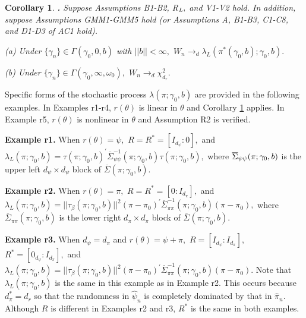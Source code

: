 \documentclass[12pt,titlepage,final,oneside,letterpaper]{article}
\newtheorem{corollary}{Corollary}[section]
\begin{document}
\begin{corollary}
\hspace{-0.08in}\textbf{.} \label{Cor Wald Linear}Suppose Assumptions \emph{%
B1-B2, R}$_{\text{\emph{L}}},$ and \emph{V1-V2} hold. In addition, suppose
Assumptions \emph{GMM1-GMM5 }hold \emph{(}or Assumptions \emph{A, B1-B3,
C1-C8, }and \emph{D1-D3 }of \emph{AC1 }hold\emph{).}

\noindent \emph{(a) }Under $\{\gamma _{n}\}\in \Gamma (\gamma _{0},0,b)$
with $||b||<\infty ,$ $W_{n}\rightarrow _{d}\lambda _{L}(\pi ^{\ast }(\gamma
_{0},b);\gamma _{0},b).$

\noindent \emph{(b) }Under $\{\gamma _{n}\}\in \Gamma (\gamma _{0},\infty
,\omega _{0}),$ $W_{n}\rightarrow _{d}\chi _{d_{r}}^{2}.$
\end{corollary}

Specific forms of the stochastic process $\lambda (\pi ;\gamma _{0},b)$ are
provided in the following examples. In Examples r1-r4, $r(\theta )$ is
linear in $\theta $ and Corollary \ref{Cor Wald Linear} applies. In Example
r5, $r(\theta )$ is nonlinear in $\theta $ and Assumption R2 is
verified.\medskip

\noindent \textbf{Example r1.}\label{exp 1} When $r(\theta )=\psi ,$ $%
R=R^{\ast }=[I_{d_{\psi }}:0],$ and $\lambda _{L}(\pi ;\gamma _{0},b)=\tau
(\pi ;\gamma _{0},b)^{\prime }\overline{\Sigma }_{\psi \psi }^{-1}(\pi
;\allowbreak \gamma _{0},b)\tau (\pi ;\gamma _{0},b),$ where $\overline{%
\Sigma }_{\psi \psi }(\pi ;\gamma _{0},b)$ is the upper left $d_{\psi
}\times d_{\psi }$ block of $\overline{\Sigma }(\pi ;\gamma _{0},b).$\medskip

\noindent \textbf{Example r2.}\label{exp 2} When $r(\theta )=\pi ,$ $%
R=R^{\ast }=[0:I_{d_{\pi }}],$ and $\lambda _{L}(\pi ;\gamma _{0},b)=||\tau
_{\beta }(\pi ;\gamma _{0},b)||^{2}(\pi -\pi _{0})^{\prime }\allowbreak 
\overline{\Sigma }_{\pi \pi }^{-1}(\pi ;\gamma _{0},b)(\pi -\pi _{0}),$
where $\overline{\Sigma }_{\pi \pi }(\pi ;\gamma _{0},b)$ is the lower right 
$d_{\pi }\times d_{\pi }$ block of $\overline{\Sigma }(\pi ;\gamma _{0},b).$%
\medskip

\noindent \textbf{Example r3.}\label{exp 3} When $d_{\psi }=d_{\pi }$ and $%
r(\theta )=\psi +\pi ,$ $R=[I_{d_{\psi }}:I_{d_{\pi }}],$ $R^{\ast
}=[0_{d_{\psi }}:I_{d_{\pi }}],$ and $\lambda _{L}(\pi ;\gamma
_{0},b)=||\tau _{\beta }(\pi ;\gamma _{0},b)||^{2}(\pi -\pi _{0})^{\prime }%
\overline{\Sigma }_{\pi \pi }^{-1}(\pi ;\gamma _{0},b)(\pi -\pi _{0}).$ Note
that $\lambda _{L}(\pi ;\gamma _{0},b)$ is the same in this example as in
Example r2. This occurs because $d_{\pi }^{\ast }=d_{r}$ so that the
randomness in $\widehat{\psi }_{n}$ is completely dominated by that in $%
\widehat{\pi }_{n}.$ Although $R$ is different in Examples r2 and r3, $%
R^{\ast }$ is the same in both examples.\medskip
\end{document}
